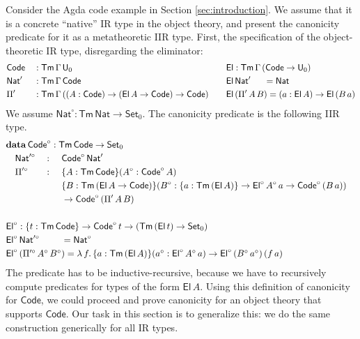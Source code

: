 \documentclass[acmsmall,screen,review]{acmart}
\newcommand{\msf}[1]{{\mathsf{#1}}}
\newcommand{\mbf}[1]{{\mathbf{#1}}}
\newcommand{\data}{\mbf{data}}
\newcommand{\U}{\msf{U}}
\newcommand{\Set}{\msf{Set}}
\newcommand{\Nat}{\msf{Nat}}
\newcommand{\El}{\msf{El}}
\newcommand{\Code}{\msf{Code}}
\newcommand{\Tm}{\msf{Tm}}
\newcommand{\w}{\circ}
\begin{document}
\begin{example}\label{ex:code-canonicity}
Consider the Agda code example in Section \ref{sec:introduction}. We assume that it is a concrete
``native'' IR type in the object theory, and present the canonicity predicate for it as a
metatheoretic IIR type. First, the specification of the object-theoretic IR type, disregarding the
eliminator:
\begin{alignat*}{4}
  &\Code &&: \Tm\,\Gamma\,\U_0 && \El : \Tm\,\Gamma\,(\Code \to \U_0) \\
  &\Nat' &&: \Tm\,\Gamma\,\Code && \El\,\Nat'\hspace{1.5em} = \Nat \\
  &\Pi'  &&: \Tm\,\Gamma\,((A : \Code) \to (\El\,A \to \Code) \to \Code)\hspace{1em} && \El\,(\Pi'\,A\,B) = (a : \El\,A) \to \El\,(B\,a)
\end{alignat*}
We assume $\Nat^\w : \Tm\,\Nat \to \Set_0$. The canonicity predicate is the following IIR type.
\begin{alignat*}{4}
  &\rlap{$\data\,\Code^\w : \Tm\,\Code \to \Set_0$}\\
  &\quad\Nat'^\w &&: \,\,&& \Code^\w\,\Nat'\\
  &\quad\Pi'^\w  &&: \,\,&&\{A : \Tm\,\Code\}(A^\w : \Code^\w\,A)\\
  &\quad         &&  && \{B : \Tm\,(\El\,A \to \Code)\}(B^\w : \{a : \Tm\,(\El\,A)\} \to \El^\w\,A^\w\,a \to \Code^\w\,(B\,a))\\
  &\quad         &&  && \to \Code^\w\,(\Pi'\,A\,B)\\
  &\rlap{}\\
  &\rlap{$\El^\w : \{t : \Tm\,\Code\} \to \Code^\w\,t \to (\Tm\,(\El\,t) \to \Set_0)$}\\
  &\rlap{$\El^\w\,\Nat'^\w  \hspace{2.4em}            = \Nat^\w$}  \\
  &\rlap{$\El^\w\,(\Pi'^\w\,A^\w\,B^\w) = \lambda\,f.\,\{a : \Tm\,(\El\,A)\}(a^\w : \El^\w\,A^\w\,a) \to \El^\w\,(B^\w\,a^\w)\,(f\,a)$}
\end{alignat*}
The predicate has to be inductive-recursive, because we have to recursively compute predicates for
types of the form $\El\,A$. Using this definition of canonicity for $\Code$, we could proceed and
prove canonicity for an object theory that supports $\Code$. Our task in this section is to
generalize this: we do the same construction generically for all IR types.
\end{example}
\end{document}
